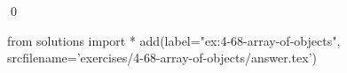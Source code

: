 
\begin{ex}
  \label{ex:4-68-array-of-objects}
  
  \qed
\end{ex}
\begin{python0}
from solutions import *
add(label="ex:4-68-array-of-objects",
    srcfilename='exercises/4-68-array-of-objects/answer.tex')
\end{python0}
